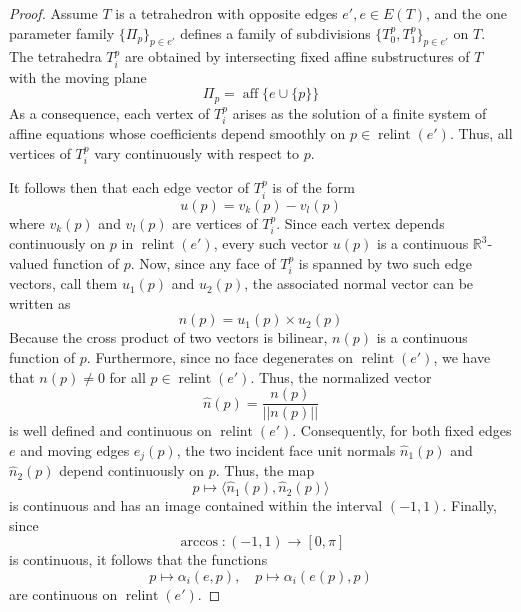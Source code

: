 \documentclass{mainresearch}
\begin{document}
\begin{proof}
	Assume $T$ is a tetrahedron with opposite edges $e',e \in E(T)$, and the one parameter family $\{\Pi_p\}_{p \in e'}$ defines a family of subdivisions $\{T_0^p,T_1^p\}_{p \in e'}$ on $T$. The tetrahedra $T_i^p$ are obtained by intersecting fixed affine substructures of $T$ with the moving plane
	\begin{equation*}
		\Pi_p = \operatorname{aff}\{e \cup \{p\}\}
	\end{equation*}
	As a consequence, each vertex of $T_i^p$ arises as the solution of a finite system of affine equations whose coefficients depend smoothly on $p \in \operatorname{relint}(e')$. Thus, all vertices of $T_i^p$ vary continuously with respect to $p$.
	
	It follows then that each edge vector of $T_i^p$ is of the form
	\begin{equation*}
		u(p) = v_k(p)-v_l(p)
	\end{equation*}
	where $v_k(p)$ and $v_l(p)$ are vertices of $T_i^p$. Since each vertex depends continuously on $p$ in $\operatorname{relint}(e')$, every such vector $u(p)$ is a continuous $\mathbb{R}^3$-valued function of $p$. Now, since any face of $T_i^p$ is spanned by two such edge vectors, call them $u_1(p)$ and $u_2(p)$, the associated normal vector can be written as
	\begin{equation*}
		n(p) = u_1(p) \times u_2(p)
	\end{equation*}
	Because the cross product of two vectors is bilinear, $n(p)$ is a continuous function of $p$. Furthermore, since no face degenerates on $\operatorname{relint}(e')$, we have that $n(p) \neq 0$ for all $p \in \operatorname{relint}(e')$. Thus, the normalized vector
	\begin{equation*}
		\hat{n}(p) = \frac{n(p)}{||n(p)||}
	\end{equation*}
	is well defined and continuous on $\operatorname{relint}(e')$. Consequently, for both fixed edges $e$ and moving edges $e_j(p)$, the two incident face unit normals $\hat{n}_1(p)$ and $\hat{n}_2(p)$ depend continuously on $p$. Thus, the map
	\begin{equation*}
		p \mapsto \langle \hat{n}_1(p),\hat{n}_2(p) \rangle
	\end{equation*}
	is continuous and has an image contained within the interval $(-1,1)$. Finally, since 
	\begin{equation*}
		\arccos:(-1,1) \to [0,\pi]
	\end{equation*}
	is continuous, it follows that the functions
	\begin{equation*}
		p \longmapsto  \alpha_i(e,p), \quad p \longmapsto  \alpha_i(e(p),p) 
	\end{equation*}
	are continuous on $\operatorname{relint}(e')$.
\end{proof}
\end{document}
